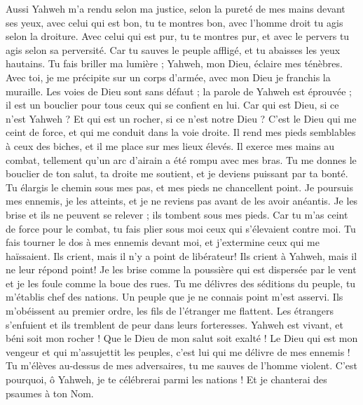 \begin{multicols}{2}
Aussi Yahweh m'a rendu selon ma justice, selon la pureté de mes mains devant ses yeux,
avec celui qui est bon, tu te montres bon, avec l'homme droit tu agis selon la droiture.
Avec celui qui est pur, tu te montres pur, et avec le pervers tu agis selon sa perversité.
Car tu sauves le peuple affligé, et tu abaisses les yeux hautains.
Tu fais briller ma lumière ; Yahweh, mon Dieu, éclaire mes ténèbres.
Avec toi, je me précipite sur un corps d'armée, avec mon Dieu je franchis la muraille.
Les voies de Dieu sont sans défaut ; la parole de Yahweh est éprouvée ; il est un bouclier pour tous ceux qui se confient en lui.
Car qui est Dieu, si ce n'est Yahweh ? Et qui est un rocher, si ce n'est notre Dieu ?
C'est le Dieu qui me ceint de force, et qui me conduit dans la voie droite.
Il rend mes pieds semblables à ceux des biches, et il me place sur mes lieux élevés.
Il exerce mes mains au combat, tellement qu'un arc d'airain a été rompu avec mes bras.
Tu me donnes le bouclier de ton salut, ta droite me soutient, et je deviens puissant par ta bonté.
Tu élargis le chemin sous mes pas, et mes pieds ne chancellent point.
Je poursuis mes ennemis, je les atteints, et je ne reviens pas avant de les avoir anéantis.
Je les brise et ils ne peuvent se relever ; ils tombent sous mes pieds.
Car tu m'as ceint de force pour le combat, tu fais plier sous moi ceux qui s'élevaient contre moi.
Tu fais tourner le dos à mes ennemis devant moi, et j'extermine ceux qui me haïssaient.
Ils crient, mais il n'y a point de libérateur! Ils crient à Yahweh, mais il ne leur répond point!
Je les brise comme la poussière qui est dispersée par le vent et je les foule comme la boue des rues.
Tu me délivres des séditions du peuple, tu m'établis chef des nations. Un peuple que je ne connais point m'est asservi.
Ils m'obéissent au premier ordre, les fils de l'étranger me flattent.
Les étrangers s'enfuient et ils tremblent de peur dans leurs forteresses.
Yahweh est vivant, et béni soit mon rocher ! Que le Dieu de mon salut soit exalté !
Le Dieu qui est mon vengeur et qui m'assujettit les peuples,
c'est lui qui me délivre de mes ennemis ! Tu m'élèves au-dessus de mes adversaires, tu me sauves de l'homme violent.
C'est pourquoi, ô Yahweh, je te célébrerai parmi les nations ! Et je chanterai des psaumes à ton Nom.

\end{multicols}
